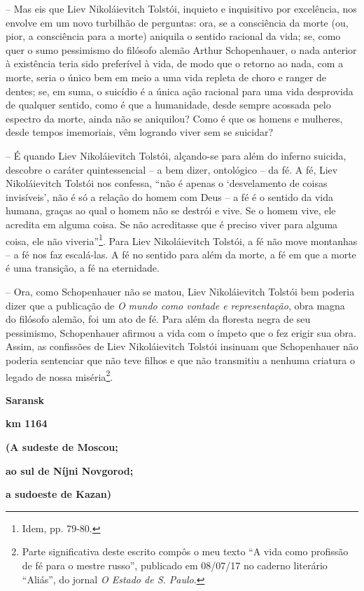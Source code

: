 -- Mas eis que Liev Nikoláievitch Tolstói, inquieto e inquisitivo por
excelência, nos envolve em um novo turbilhão de perguntas: ora, se a
consciência da morte (ou, pior, a consciência para a morte) aniquila o
sentido racional da vida; se, como quer o sumo pessimismo do filósofo
alemão Arthur Schopenhauer, o nada anterior à existência teria sido
preferível à vida, de modo que o retorno ao nada, com a morte, seria o
único bem em meio a uma vida repleta de choro e ranger de dentes; se, em
suma, o suicídio é a única ação racional para uma vida desprovida de
qualquer sentido, como é que a humanidade, desde sempre acossada pelo
espectro da morte, ainda não se aniquilou? Como é que os homens e
mulheres, desde tempos imemoriais, vêm logrando viver sem se suicidar?

-- É quando Liev Nikoláievitch Tolstói, alçando-se para além do inferno
suicida, descobre o caráter quintessencial -- a bem dizer, ontológico --
da fé. A fé, Liev Nikoláievitch Tolstói nos confessa, ``não é apenas o
`desvelamento de coisas invisíveis', não é só a relação do homem com
Deus -- a fé é o sentido da vida humana, graças ao qual o homem não se
destrói e vive. Se o homem vive, ele acredita em alguma coisa. Se não
acreditasse que é preciso viver para alguma coisa, ele não
viveria''\footnote{Idem, pp. 79-80.}. Para Liev Nikoláievitch Tolstói, a
fé não move montanhas -- a fé nos faz escalá-las. A fé no sentido para
além da morte, a fé em que a morte é uma transição, a fé na eternidade.

-- Ora, como Schopenhauer não se matou, Liev Nikoláievitch Tolstói bem
poderia dizer que a publicação de \emph{O mundo como vontade e
representação}, obra magna do filósofo alemão, foi um ato de fé. Para
além da floresta negra de seu pessimismo, Schopenhauer afirmou a vida
com o ímpeto que o fez erigir sua obra. Assim, as confissões de Liev
Nikoláievitch Tolstói insinuam que Schopenhauer não poderia sentenciar
que não teve filhos e que não transmitiu a nenhuma criatura o legado de
nossa miséria\footnote{Parte significativa deste escrito compôs o meu
  texto ``A vida como profissão de fé para o mestre russo'', publicado
  em 08/07/17 no caderno literário ``Aliás'', do jornal \emph{O Estado
  de S. Paulo}.}.

\textbf{Saransk}

\textbf{km 1164}

\textbf{(A sudeste de Moscou;}

\textbf{ao sul de Níjni Novgorod;}

\textbf{a sudoeste de Kazan)}

